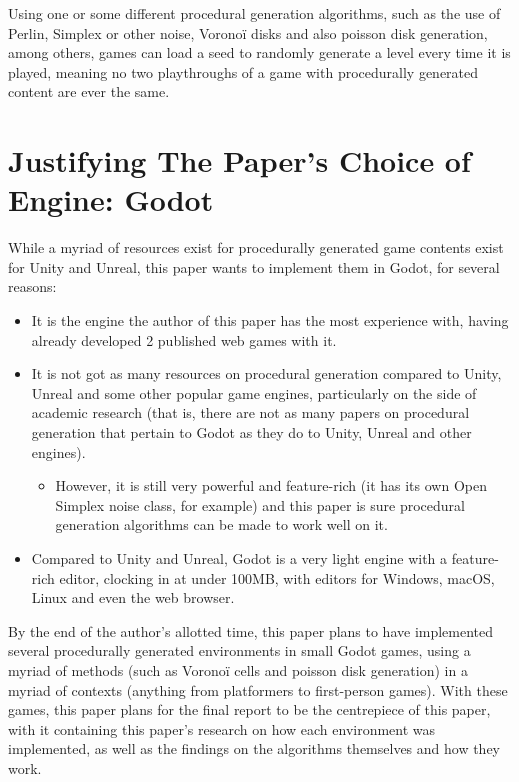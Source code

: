 Using one or some different procedural generation algorithms, such as the use of Perlin, Simplex or other noise, Voronoï disks and also poisson disk generation, among others, games can load a seed to randomly generate a level every time it is played, meaning no two playthroughs of a game with procedurally generated content are ever the same.

\section{Justifying The Paper's Choice of Engine: Godot}

While a myriad of resources exist for procedurally generated game contents exist for Unity and Unreal, this paper wants to implement them in Godot, for several reasons:

\begin{itemize}
	\item It is the engine the author of this paper has the most experience with, having already developed 2 published web games with it.
	\item It is not got as many resources on procedural generation compared to Unity, Unreal and some other popular game engines, particularly on the side of academic research (that is, there are not as many papers on procedural generation that pertain to Godot as they do to Unity, Unreal and other engines).
	\begin{itemize}
		\item However, it is still very powerful and feature-rich (it has its own Open Simplex noise class, for example) and this paper is sure procedural generation algorithms can be made to work well on it.
	\end{itemize}
	\item Compared to Unity and Unreal, Godot is a very light engine with a feature-rich editor, clocking in at under 100MB, with editors for Windows, macOS, Linux and even the web browser. 
\end{itemize}

By the end of the author's allotted time, this paper plans to have implemented several procedurally generated environments in small Godot games, using a myriad of methods (such as Voronoï cells and poisson disk generation) in a myriad of contexts (anything from platformers to first-person games). With these games, this paper plans for the final report to be the centrepiece of this paper, with it containing this paper's research on how each environment was implemented, as well as the findings on the algorithms themselves and how they work.

